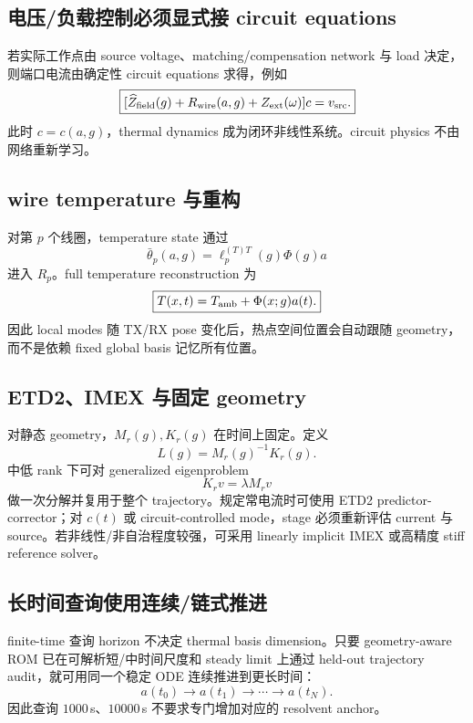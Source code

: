 \subsection{电压/负载控制必须显式接 circuit equations}
若实际工作点由 source voltage、matching/compensation network 与 load 决定，则端口电流由确定性 circuit equations 求得，例如
\begin{equation}
\boxed{
[\widehat Z_{\rm field}(g)+R_{\rm wire}(a,g)+Z_{\rm ext}(\omega)]c
=v_{\rm src}.
}
\end{equation}
此时 $c=c(a,g)$，thermal dynamics 成为闭环非线性系统。circuit physics 不由网络重新学习。

\subsection{wire temperature 与重构}
对第 $p$ 个线圈，temperature state 通过
\begin{equation}
\bar\theta_p(a,g)
=\ell_p^{(T)T}(g)\Phi(g)a
\end{equation}
进入 $R_p$。full temperature reconstruction 为
\begin{equation}
\boxed{T(x,t)=T_{\rm amb}+\Phi(x;g)a(t).}
\end{equation}
因此 local modes 随 TX/RX pose 变化后，热点空间位置会自动跟随 geometry，而不是依赖 fixed global basis 记忆所有位置。

\subsection{ETD2、IMEX 与固定 geometry}
对静态 geometry，$M_r(g),K_r(g)$ 在时间上固定。定义
\begin{equation}
L(g)=M_r(g)^{-1}K_r(g).
\end{equation}
中低 rank 下可对 generalized eigenproblem
\begin{equation}
K_rv=\lambda M_rv
\end{equation}
做一次分解并复用于整个 trajectory。规定常电流时可使用 ETD2 predictor-corrector；对 $c(t)$ 或 circuit-controlled mode，stage 必须重新评估 current 与 source。若非线性/非自治程度较强，可采用 linearly implicit IMEX 或高精度 stiff reference solver。

\subsection{长时间查询使用连续/链式推进}
finite-time 查询 horizon 不决定 thermal basis dimension。只要 geometry-aware ROM 已在可解析短/中时间尺度和 steady limit 上通过 held-out trajectory audit，就可用同一个稳定 ODE 连续推进到更长时间：
\begin{equation}
a(t_0)\rightarrow a(t_1)\rightarrow\cdots\rightarrow a(t_N).
\end{equation}
因此查询 $1000\,$s、$10000\,$s 不要求专门增加对应的 resolvent anchor。

